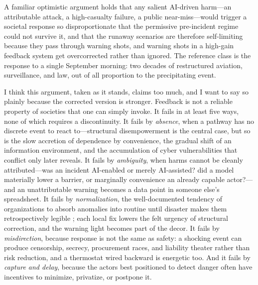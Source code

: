 \documentclass[11pt]{article}
\begin{document}
A familiar optimistic argument holds that any salient AI-driven harm---an attributable attack, a high-casualty failure, a public near-miss---would trigger a societal response so disproportionate that the permissive pre-incident regime could not survive it, and that the runaway scenarios are therefore self-limiting because they pass through warning shots, and warning shots in a high-gain feedback system get overcorrected rather than ignored. The reference class is the response to a single September morning: two decades of restructured aviation, surveillance, and law, out of all proportion to the precipitating event.

I think this argument, taken as it stands, claims too much, and I want to say so plainly because the corrected version is stronger. Feedback is not a reliable property of societies that one can simply invoke. It fails in at least five ways, none of which requires a discontinuity. It fails by \emph{absence}, when a pathway has no discrete event to react to---structural disempowerment is the central case, but so is the slow accretion of dependence by convenience, the gradual shift of an information environment, and the accumulation of cyber vulnerabilities that conflict only later reveals. It fails by \emph{ambiguity}, when harms cannot be cleanly attributed---was an incident AI-enabled or merely AI-assisted? did a model materially lower a barrier, or marginally convenience an already capable actor?---and an unattributable warning becomes a data point in someone else's spreadsheet. It fails by \emph{normalization}, the well-documented tendency of organizations to absorb anomalies into routine until disaster makes them retrospectively legible \citep{vaughan1996}; each local fix lowers the felt urgency of structural correction, and the warning light becomes part of the decor. It fails by \emph{misdirection}, because response is not the same as safety: a shocking event can produce censorship, secrecy, procurement races, and liability theater rather than risk reduction, and a thermostat wired backward is energetic too. And it fails by \emph{capture and delay}, because the actors best positioned to detect danger often have incentives to minimize, privatize, or postpone it.
\end{document}
